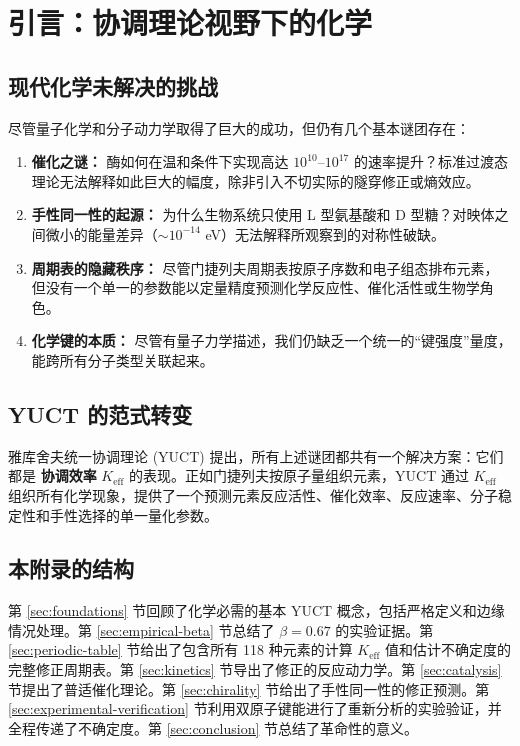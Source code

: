 \documentclass[11pt,a4paper]{article}
\newcommand{\Keff}{K_{\mathrm{eff}}}
\begin{document}
	\tableofcontents
	\newpage
	
	\section{引言：协调理论视野下的化学}
	\label{sec:intro}
	
	\subsection{现代化学未解决的挑战}
	
	尽管量子化学和分子动力学取得了巨大的成功，但仍有几个基本谜团存在：
	
	\begin{enumerate}
		\item \textbf{催化之谜：} 酶如何在温和条件下实现高达 $10^{10}$–$10^{17}$ 的速率提升？标准过渡态理论无法解释如此巨大的幅度，除非引入不切实际的隧穿修正或熵效应。
		\item \textbf{手性同一性的起源：} 为什么生物系统只使用 L 型氨基酸和 D 型糖？对映体之间微小的能量差异（$\sim 10^{-14}$ eV）无法解释所观察到的对称性破缺。
		\item \textbf{周期表的隐藏秩序：} 尽管门捷列夫周期表按原子序数和电子组态排布元素，但没有一个单一的参数能以定量精度预测化学反应性、催化活性或生物学角色。
		\item \textbf{化学键的本质：} 尽管有量子力学描述，我们仍缺乏一个统一的“键强度”量度，能跨所有分子类型关联起来。
	\end{enumerate}
	
	\subsection{YUCT 的范式转变}
	
	雅库舍夫统一协调理论 (YUCT) 提出，所有上述谜团都共有一个解决方案：它们都是 \textbf{协调效率} $\Keff$ 的表现。正如门捷列夫按原子量组织元素，YUCT 通过 $\Keff$ 组织所有化学现象，提供了一个预测元素反应活性、催化效率、反应速率、分子稳定性和手性选择的单一量化参数。
	
	\subsection{本附录的结构}
	
	第 \ref{sec:foundations} 节回顾了化学必需的基本 YUCT 概念，包括严格定义和边缘情况处理。第 \ref{sec:empirical-beta} 节总结了 $\beta = 0.67$ 的实验证据。第 \ref{sec:periodic-table} 节给出了包含所有 118 种元素的计算 $\Keff$ 值和估计不确定度的完整修正周期表。第 \ref{sec:kinetics} 节导出了修正的反应动力学。第 \ref{sec:catalysis} 节提出了普适催化理论。第 \ref{sec:chirality} 节给出了手性同一性的修正预测。第 \ref{sec:experimental-verification} 节利用双原子键能进行了重新分析的实验验证，并全程传递了不确定度。第 \ref{sec:conclusion} 节总结了革命性的意义。
	
\end{document}
